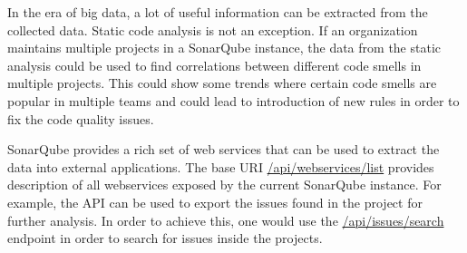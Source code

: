 In the era of big data, a lot of useful information can be extracted from the collected data.
Static code analysis is not an exception.
If an organization maintains multiple projects in a SonarQube instance, the data from the static
analysis could be used to find correlations between different code smells in multiple projects.
This could show some trends where certain code smells are popular in multiple teams and could
lead to introduction of new rules in order to fix the code quality issues.

SonarQube provides a rich set of web services that can be used to extract the data into external applications.
The base URI \url{/api/webservices/list} provides description of all webservices exposed by the current SonarQube instance.
For example, the API can be used to export the issues found in the project for further analysis.
In order to achieve this, one would use the \url{/api/issues/search} endpoint in order to search for issues inside the projects.
